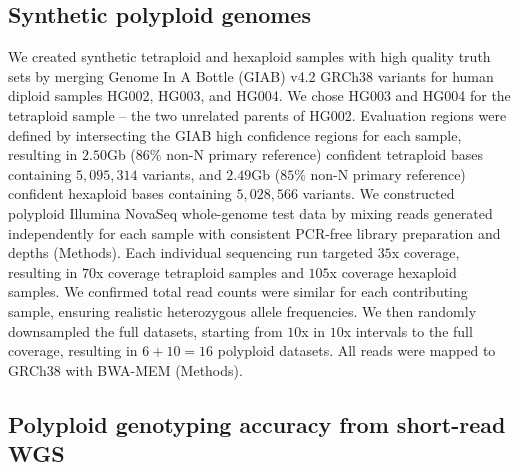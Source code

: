 \documentclass[notitlepage, twocolumn, 10pt]{article}
\begin{document}
\subsection*{Synthetic polyploid genomes} We created synthetic tetraploid and hexaploid samples with high quality truth sets by merging Genome In A Bottle \cite{RN651} (GIAB) v4.2 GRCh38 variants for human diploid samples HG002, HG003, and HG004. We chose HG003 and HG004 for the tetraploid sample -- the two unrelated parents of HG002. Evaluation regions were defined by intersecting \cite{RN757} the GIAB high confidence regions for each sample, resulting in $2.50$Gb ($86\%$ non-N primary reference) confident tetraploid bases containing $5,095,314$ variants, and $2.49$Gb ($85\%$ non-N primary reference) confident hexaploid bases containing $5,028,566$ variants. We constructed polyploid Illumina NovaSeq whole-genome test data by mixing reads generated independently for each sample with consistent PCR-free library preparation and depths (Methods). Each individual sequencing run targeted $35$x coverage, resulting in $70$x coverage tetraploid samples and $105$x coverage hexaploid samples. We confirmed total read counts were similar for each contributing sample, ensuring realistic heterozygous allele frequencies. We then randomly downsampled the full datasets, starting from $10$x in $10$x intervals to the full coverage, resulting in $6 + 10 = 16$ polyploid datasets. All reads were mapped to GRCh38 with BWA-MEM \cite{RN539} (Methods).

\subsection*{Polyploid genotyping accuracy from short-read WGS}
\end{document}

